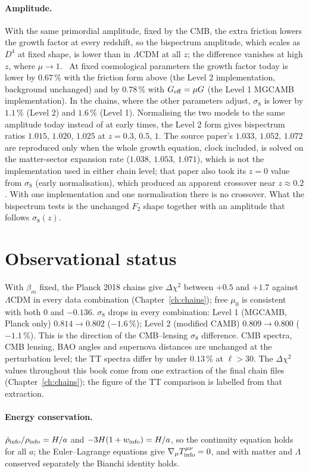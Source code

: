 \paragraph{Amplitude.} With the same primordial amplitude, fixed by the CMB, the extra friction lowers the growth factor at every redshift, so the
bispectrum amplitude, which scales as $D^4$ at fixed shape, is lower than in $\Lambda$CDM at all $z$; the difference vanishes at high $z$, where $\mu\to1$.
\calc\ At fixed cosmological parameters the growth factor today is lower by $0.67\,\%$ with the friction form above (the Level 2 implementation, background
unchanged) and by $0.78\,\%$ with $G_{\rm eff}=\mu G$ (the Level 1 MGCAMB implementation). In the chains, where the other parameters adjust, $\sigma_8$ is lower
by $1.1\,\%$ (Level 2) and $1.6\,\%$ (Level 1). Normalising the two models to the same amplitude today instead of at early times, the Level 2 form gives
bispectrum ratios $1.015$, $1.020$, $1.025$ at $z=0.3$, $0.5$, $1$. The source paper's $1.033$, $1.052$, $1.072$ are reproduced only when the whole growth
equation, clock included, is solved on the matter-sector expansion rate ($1.038$, $1.053$, $1.071$), which is not the implementation used in either chain
level; that paper also took its $z=0$ value from $\sigma_8$ (early normalisation), which produced an apparent crossover near $z\approx0.2$. With one
implementation and one normalisation there is no crossover. What the bispectrum tests is the unchanged $F_2$ shape together with an amplitude that follows $\sigma_8(z)$.

\section{Observational status}
With $\beta_m$ fixed, the Planck 2018 chains give $\Delta\chi^2$ between $+0.5$ and $+1.7$ against $\Lambda$CDM in every data combination
(Chapter~\ref{ch:chains}); free $\mu_0$ is consistent with both $0$ and $-0.136$. $\sigma_8$ drops in every combination: Level 1 (MGCAMB, Planck only) $0.814\to0.802$ ($-1.6\,\%$); Level 2 (modified CAMB) $0.809\to0.800$ ($-1.1\,\%$). This is the direction of the
CMB--lensing $\sigma_8$ difference. CMB spectra, CMB lensing, BAO angles and supernova distances are unchanged at the perturbation level; the TT spectra
differ by under $0.13\,\%$ at $\ell>30$.
The $\Delta\chi^2$ values throughout this book come from one extraction of the final chain files (Chapter~\ref{ch:chains}); the figure of the
TT comparison is labelled from that extraction.
\paragraph{Energy conservation.} $\dot\rho_{\rm info}/\rho_{\rm info}=H/a$ and $-3H(1+w_{\rm info})=H/a$, so the continuity equation holds for all $a$; the
Euler--Lagrange equations give $\nabla_\mu T^{\mu\nu}_{\rm info}=0$, and with matter and $\Lambda$ conserved separately the Bianchi identity holds.
